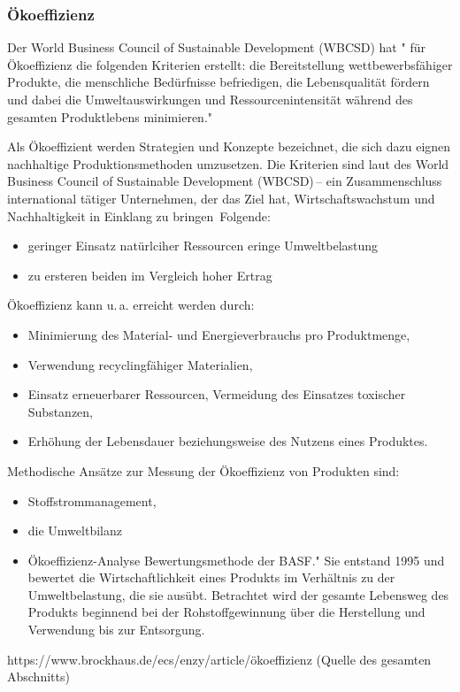 \documentclass{article}
\begin{document}
\subsubsection{Ökoeffizienz}
 Der World Business Council of Sustainable Development (WBCSD) hat " für Ökoeffizienz die folgenden Kriterien erstellt: die Bereitstellung wettbewerbsfähiger Produkte, die menschliche Bedürfnisse befriedigen, die Lebensqualität fördern und dabei die Umweltauswirkungen und Ressourcenintensität während des gesamten Produktlebens minimieren." \cite{OkoeffizienzBrockhaus.de}

Als Ökoeffizient werden Strategien und Konzepte bezeichnet, die sich dazu eignen nachhaltige Produktionsmethoden umzusetzen. Die Kriterien sind laut des World Business Council of Sustainable Development (WBCSD) – ein Zusammenschluss international tätiger Unternehmen, der das Ziel hat, Wirtschaftswachstum und Nachhaltigkeit in Einklang zu bringen  Folgende:
\begin{itemize}
\item geringer Einsatz natürlciher Ressourcen
\itemg eringe Umweltbelastung
\item zu ersteren beiden im Vergleich hoher Ertrag
\end{itemize}

Ökoeffizienz kann u. a. erreicht werden durch:
\begin{itemize}
\item Minimierung des Material- und Energieverbrauchs pro Produktmenge,
\item Verwendung recyclingfähiger Materialien,
\item Einsatz erneuerbarer Ressourcen, Vermeidung des Einsatzes toxischer Substanzen,
\item Erhöhung der Lebensdauer beziehungsweise des Nutzens eines Produktes.
\end{itemize}
Methodische Ansätze zur Messung der Ökoeffizienz von Produkten sind:
\begin{itemize}
\item Stoffstrommanagement,
\item die Umweltbilanz
\item Ökoeffizienz-Analyse Bewertungsmethode der BASF." Sie entstand 1995 und bewertet die Wirtschaftlichkeit eines Produkts im Verhältnis zu der Umweltbelastung, die sie ausübt. Betrachtet wird der gesamte Lebensweg des Produkts beginnend bei der Rohstoffgewinnung über die Herstellung und Verwendung bis zur Entsorgung.
\end{itemize}https://www.brockhaus.de/ecs/enzy/article/ökoeffizienz (Quelle des gesamten Abschnitts)
\end{document}
